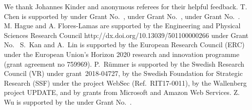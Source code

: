 \documentclass[acmsmall,screen]{acmart}\settopmatter{}
\begin{document}



%
 








%






\begin{acks}
We thank Johannes Kinder and anonymous referees for their helpful feedback.
%
T. Chen is supported by 
 under Grant No.~,   under Grant No.~,  under Grant No.~.
    M. Hague and A. Flores-Lamas are supported by the
                 {Engineering and Physical Sciences Research Council}
                 {http://dx.doi.org/10.13039/501100000266}
    under Grant No.~
    S.~Kan and A.~Lin is supported by the European Research Council (ERC) 
    under the European
    Union's Horizon 2020 research and innovation programme (grant agreement no
    759969).
    P.\ R\"ummer is supported by the Swedish Research Council (VR)
    under grant~2018-04727, by the Swedish Foundation for Strategic
    Research (SSF) under the project WebSec (Ref.\ RIT17-0011), by the
    Wallenberg project UPDATE, and by grants from Microsoft and Amazon
    Web Services.
    Z. Wu is supported by the
    under Grant No.~.
\end{acks}


%


%
%
%
\end{document}
